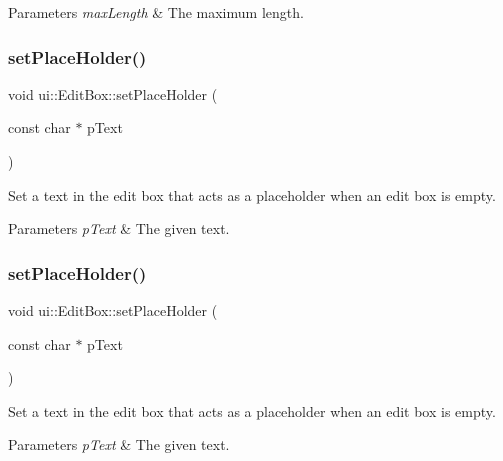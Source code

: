 \begin{DoxyParams}{Parameters}
{\em max\+Length} & The maximum length. \\
\hline
\end{DoxyParams}
\mbox{\label{classui_1_1EditBox_a89c526a2899c99ff09bd9fb6e435e799}} 
\subsubsection{\texorpdfstring{set\+Place\+Holder()}{setPlaceHolder()}\hspace{0.1cm}{\footnotesize\ttfamily [1/2]}}
{\footnotesize\ttfamily void ui\+::\+Edit\+Box\+::set\+Place\+Holder (\begin{DoxyParamCaption}\item[{const char $\ast$}]{p\+Text }\end{DoxyParamCaption})}

Set a text in the edit box that acts as a placeholder when an edit box is empty. 
\begin{DoxyParams}{Parameters}
{\em p\+Text} & The given text. \\
\hline
\end{DoxyParams}
\mbox{\label{classui_1_1EditBox_a89c526a2899c99ff09bd9fb6e435e799}} 
\subsubsection{\texorpdfstring{set\+Place\+Holder()}{setPlaceHolder()}\hspace{0.1cm}{\footnotesize\ttfamily [2/2]}}
{\footnotesize\ttfamily void ui\+::\+Edit\+Box\+::set\+Place\+Holder (\begin{DoxyParamCaption}\item[{const char $\ast$}]{p\+Text }\end{DoxyParamCaption})}

Set a text in the edit box that acts as a placeholder when an edit box is empty. 
\begin{DoxyParams}{Parameters}
{\em p\+Text} & The given text. \\
\hline
\end{DoxyParams}
\mbox{\label{classui_1_1EditBox_a19ef30f768dcf5d67808e0e67b7809b9}} 
